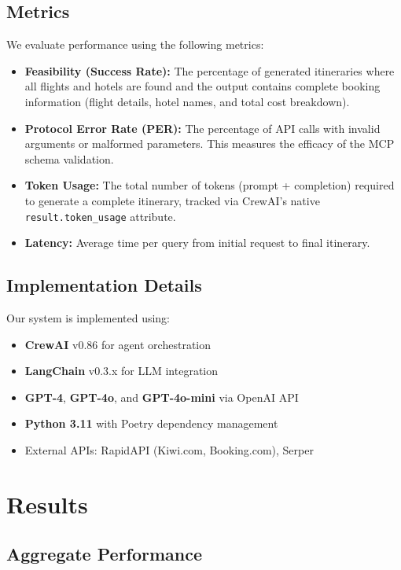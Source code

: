 \documentclass[conference]{IEEEtran}
\begin{document}
\subsection{Metrics}
We evaluate performance using the following metrics:
\begin{itemize}
    \item \textbf{Feasibility (Success Rate):} The percentage of generated itineraries where all flights and hotels are found and the output contains complete booking information (flight details, hotel names, and total cost breakdown).
    \item \textbf{Protocol Error Rate (PER):} The percentage of API calls with invalid arguments or malformed parameters. This measures the efficacy of the MCP schema validation.
    \item \textbf{Token Usage:} The total number of tokens (prompt + completion) required to generate a complete itinerary, tracked via CrewAI's native \texttt{result.token\_usage} attribute.
    \item \textbf{Latency:} Average time per query from initial request to final itinerary.
\end{itemize}

\subsection{Implementation Details}
Our system is implemented using:
\begin{itemize}
    \item \textbf{CrewAI} v0.86 for agent orchestration
    \item \textbf{LangChain} v0.3.x for LLM integration
    \item \textbf{GPT-4}, \textbf{GPT-4o}, and \textbf{GPT-4o-mini} via OpenAI API
    \item \textbf{Python 3.11} with Poetry dependency management
    \item External APIs: RapidAPI (Kiwi.com, Booking.com), Serper
\end{itemize}

\section{Results}

\subsection{Aggregate Performance}
\end{document}
